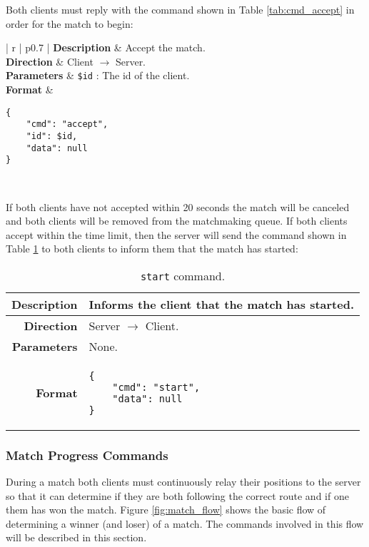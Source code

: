 Both clients must reply with the command shown in Table \ref{tab:cmd_accept} in order for the match to begin:

\begin{table}[!ht]
	\centering
	\begin{tabular}{| r | p{} |}
		\hline
		\textbf{Description} & Accept the match. \\ \hline
		\textbf{Direction} & Client $\rightarrow$ Server. \\ \hline
		\textbf{Parameters} & \texttt{\$id} : The id of the client. \\ \hline
		\textbf{Format} &
\begin{lstlisting}[language=Command]
{
	"cmd": "accept",
	"id": $id,
	"data": null
}
\end{lstlisting}
		\\ \hline
	\end{tabular}
	\caption{\texttt{accept} command.}
	\label{tab:cmd_accept}
\end{table}

If both clients have not accepted within 20 seconds the match will be canceled and both clients will be removed from the matchmaking queue.
If both clients accept within the time limit, then the server will send the command shown in Table \ref{tab:cmd_start} to both clients to inform them that the match has started:

\begin{table}[!ht]
	\centering
	\begin{tabular}{| r | p{} |}
		\hline
		\textbf{Description} & Informs the client that the match has started. \\ \hline
		\textbf{Direction} & Server $\rightarrow$ Client. \\ \hline
		\textbf{Parameters} & None. \\ \hline
		\textbf{Format} &
\begin{lstlisting}[language=Command]
{
	"cmd": "start",
	"data": null
}
\end{lstlisting}
		\\ \hline
	\end{tabular}
	\caption{\texttt{start} command.}
	\label{tab:cmd_start}
\end{table}

\subsubsection{Match Progress Commands}
During a match both clients must continuously relay their positions to the server so that it can determine if they are both following the correct route and if one them has won the match.
Figure \ref{fig:match_flow} shows the basic flow of determining a winner (and loser) of a match.
The commands involved in this flow will be described in this section.

